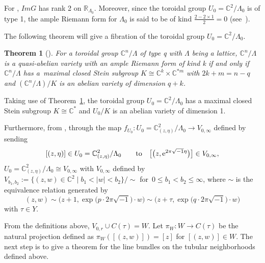 \documentclass[10pt,a4paper]{amsart}
\numberwithin{equation}{section}
\newtheorem{Theorem}{Theorem}[section]
\def\operatorname#1{#1}
\begin{document}
For \smash{$G=\bigl(\begin{smallmatrix}\frac{1}{\operatorname{\operatorname{Im}}\tau} & 0\\0 & 0\end{smallmatrix}\bigr)$}, $\operatorname{\operatorname{Im}}G$ has rank 2 on $\mathbb{R}_{\Lambda_0}$. Moreover, since the toroidal group $U_0=\mathbb{C}^2/\Lambda_0$ is of type 1, the ample Riemann form \smash{$G=\bigl(\begin{smallmatrix}\frac{1}{\operatorname{\operatorname{Im}}\tau} & 0\\0 & 0\end{smallmatrix}\bigr)$} for $\Lambda_0$ is said to be of kind $\frac{2-2\times1}{2}=0$ (see~\cite[Definition~3.1.12]{Yukitaka-Klaus}).

The following theorem will give a fibration of the toroidal group $U_0=\mathbb{C}^2/\Lambda_0$.

\begin{Theorem}[{\cite[Theorem~3.1.16]{Yukitaka-Klaus}}]\label{Theorem2.18}
 For a toroidal group $\mathbb{C}^n/\Lambda$ of type q with $\Lambda$ being a lattice, $\mathbb{C}^n/\Lambda$ is a quasi-abelian variety with an ample Riemann form of kind k if and only if $\mathbb{C}^n/\Lambda$ has a~maximal closed Stein subgroup $K \cong \mathbb{C}^k\times \mathbb{C}^{*m}$ with $2k+m=n-q$ and $(\mathbb{C}^n/\Lambda)/K$ is an abelian variety of dimension $q+k$.
\end{Theorem}

Taking use of Theorem~\ref{Theorem2.18}, the toroidal group $U_0=\mathbb{C}^2/\Lambda_0$ has a maximal closed Stein subgroup $K \cong \mathbb{C}^*$ and $U_0/K$ is an abelian variety of dimension 1.

Furthermore, from \cite{Takayuki-Takato2}, through the map $f_{U_0}\colon U_0=\mathbb{C}^2_{(z,\eta)}/{\Lambda_0}\rightarrow V_{0,\infty}$ defined by sending
\[
[(z,\eta)]\in U_0=\mathbb{C}^2_{(z,\eta)}/{\Lambda_0} \qquad \text{to} \quad \big[\bigl(z,{\rm e}^{2\pi \sqrt{-1}\eta}\bigr)\big]\in V_{0,\infty},
\]
$U_0=\mathbb{C}^2_{(z,\eta)}/{\Lambda_0}\cong V_{0,\infty}$ with $V_{0,\infty}$ defined by
$V_{b_1,b_2}:=\big \{ (z,w)\in \mathbb{C}^2\mid b_1<|w|<b_2 \big \}/{\sim}$
for~${0\leq b_1<b_2\leq\infty}$, where $\sim$ is the equivalence relation generated by
\[(z,w)\sim\big(z+1,\exp\big(p\cdot 2\pi \sqrt{-1}\big)\cdot w)\sim\big(z+\tau,\exp\big(q\cdot 2\pi \sqrt{-1}\big)\cdot w\big)\]
with $\tau \in Y$.

From the definitions above, $V_{0,r}\cup C(\tau)=W$. Let $\pi_W\colon W \rightarrow C(\tau)$ be the natural projection defined as $\pi_W([(z,w)])=[z]$ for $[(z,w)]\in W$. The next step is to give a theorem for the line bundles on the tubular neighborhoods defined above.
\end{document}
